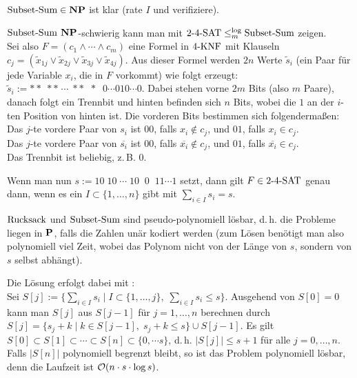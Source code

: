 \begin{Beweis}
    $\SubsetSum \in \NP$ ist klar (rate $I$ und verifiziere).
    
    $\SubsetSum$ $\NP$-schwierig kann man mit $\kSAT{2\text{-}4} \le_m^{\log} \SubsetSum$ zeigen.\\
    Sei also $F = (c_1 \land \dotsb \land c_m)$ eine Formel in $\kKNF{4}$ mit
    Klauseln $c_j = (\widetilde{x}_{1j} \lor \widetilde{x}_{2j} \lor
    \widetilde{x}_{3j} \lor \widetilde{x}_{4j})$.
    Aus dieser Formel werden $2n$ Werte $\widetilde{s}_i$
    (ein Paar für jede Variable $x_i$, die in $F$ vorkommt) wie folgt erzeugt:
    $\widetilde{s}_i := \ast\ast\; \ast\ast\; \dotsb\; \ast\ast\;\; \ast\;\;
    0 \dotsb 010 \dotsb 0$.
    Dabei stehen vorne $2m$ Bits (also $m$ Paare), danach folgt ein Trennbit und hinten befinden
    sich $n$ Bits, wobei die $1$ an der $i$-ten Position von hinten ist.
    Die vorderen Bits bestimmen sich folgendermaßen:\\
    Das $j$-te vordere Paar von $s_i$ ist $00$,
    falls $x_i \notin c_j$, und $01$, falls $x_i \in c_j$.\\
    Das $j$-te vordere Paar von $\overline{s_i}$ ist $00$,
    falls $\overline{x_i} \notin c_j$, und $01$, falls $\overline{x_i} \in c_j$.\\
    Das Trennbit ist beliebig, z.\,B. $0$.
    
    Wenn man nun $s := 10\; 10\; \dotsb\; 10\;\; 0\;\; 11 \dotsb 1$ setzt,
    dann gilt $F \in \kSAT{2\text{-}4}$ genau dann, wenn
    es ein $I \subset \{1, \dotsc, n\}$ gibt mit $\sum_{i \in I} s_i = s$.
\end{Beweis}

\linie

\begin{Bem}
    $\Rucksack$ und $\SubsetSum$ sind pseudo-polynomiell lösbar,
    d.\,h. die Probleme liegen in $\P$, falls die Zahlen unär kodiert werden
    (zum Lösen benötigt man also polynomiell viel Zeit,
    wobei das Polynom nicht von der Länge von $s$, sondern von $s$ selbst abhängt).
    
    Die Lösung erfolgt dabei mit :\\
    Sei $S[j] := \{\sum_{i \in I} s_i \;|\; I \subset \{1, \dotsc, j\},\;
    \sum_{i \in I} s_i \le s\}$.
    Ausgehend von $S[0] = 0$ kann man $S[j]$ aus $S[j-1]$ für $j = 1, \dotsc, n$ berechnen
    durch $S[j] = \{s_j + k \;|\; k \in S[j-1],\; s_j + k \le s\} \cup S[j-1]$.
    Es gilt $S[0] \subset S[1] \subset \dotsb \subset S[n] \subset \{0, \dotsb s\}$,
    d.\,h. $|S[j]| \le s + 1$ für alle $j = 0, \dotsc, n$.
    Falls $|S[n]|$ polynomiell begrenzt bleibt, so ist das Problem polynomiell lösbar,
    denn die Laufzeit ist $\O(n \cdot s \cdot \log s)$.
\end{Bem}

